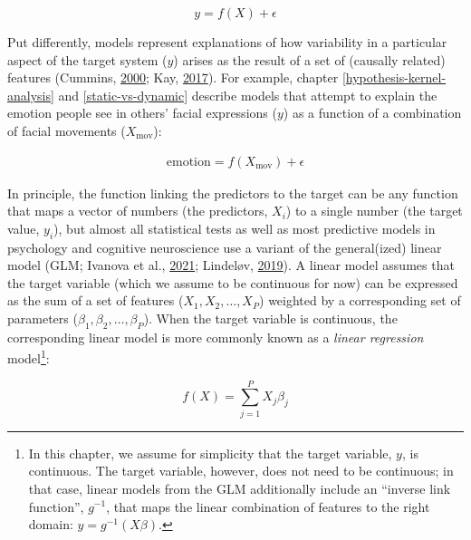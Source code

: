 \documentclass[12pt,american,a4paper,oneside,]{memoir} %
\let\rmarkdownfootnote\footnote%
\def\footnote{\protect\rmarkdownfootnote}
\begin{document}
\begin{equation}
y = f(X) + \epsilon
\end{equation}

Put differently, models represent explanations of how variability in a particular aspect of the target system (\(y\)) arises as the result of a set of (causally related) features (Cummins, \protect\hyperlink{ref-Cummins2000-pk}{2000}; Kay, \protect\hyperlink{ref-Kay2017-vr}{2017}). For example, chapter \ref{hypothesis-kernel-analysis} and \ref{static-vs-dynamic} describe models that attempt to explain the emotion people see in others' facial expressions (\(y\)) as a function of a combination of facial movements (\(X_{\mathrm{mov}}\)):

\begin{align}
\mathrm{emotion} = f(X_{\mathrm{mov}}) + \epsilon
\end{align}

In principle, the function linking the predictors to the target can be any function that maps a vector of numbers (the predictors, \(X_{i}\)) to a single number (the target value, \(y_{i}\)), but almost all statistical tests as well as most predictive models in psychology and cognitive neuroscience use a variant of the general(ized) linear model (GLM; Ivanova et al., \protect\hyperlink{ref-Ivanova2021-wk}{2021}; Lindeløv, \protect\hyperlink{ref-Lindelov2019-jk}{2019}). A linear model assumes that the target variable (which we assume to be continuous for now) can be expressed as the sum of a set of features (\(X_{1}, X_{2}, \dots , X_{P}\)) weighted by a corresponding set of parameters (\(\beta_{1}, \beta_{2}, \dots , \beta_{P}\)). When the target variable is continuous, the corresponding linear model is more commonly known as a \emph{linear regression} model\footnote{In this chapter, we assume for simplicity that the target variable, \(y\), is continuous. The target variable, however, does not need to be continuous; in that case, linear models from the GLM additionally include an ``inverse link function'', \(g^{-1}\), that maps the linear combination of features to the right domain: \(y = g^{-1}(X\beta)\).}:

\begin{equation}
f(X) = \sum_{j=1}^{P}X_{j} \beta_{j}
\end{equation}
\end{document}
